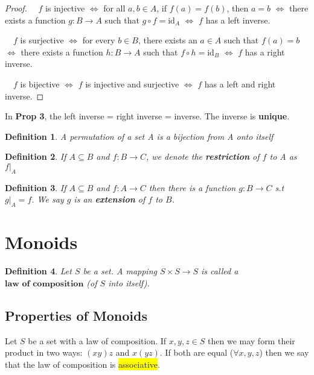 \documentclass[12pt]{article}
\let\to=\rightarrow
\newcommand{\mybox}[2][black]{\colorbox{#1}{#2}}
\newtheorem{definition}{Definition}
\begin{document}
\begin{proof}
\item[1] $\quad f$ is injective $\iff$ for all $a, b \in A$, if $f(a) = f(b)$, then $a = b$ $\iff$ there exists a function $g: B \to A$ such that $g \circ f = \text{id}_A$ $\iff$ $f$ has a left inverse.
\item[2] $\quad f$ is surjective $\iff$ for every $b \in B$, there exists an $a \in A$ such that $f(a) = b$ $\iff$ there exists a function $h: B \to A$ such that $f \circ h = \text{id}_B$ $\iff$ $f$ has a right inverse.
\item[3] $\quad f$ is bijective $\iff$ $f$ is injective and surjective $\iff$ $f$ has a left and right inverse.

\end{proof}

In \textbf{Prop 3}, the left inverse = right inverse = inverse. The inverse is \textbf{unique}.

\begin{definition}
A permutation of a set A is a bijection from A onto itself
\end{definition}

\begin{definition}
If $A \subseteq B$ and $f: B \to C$, we denote the \textbf{restriction} of $f$ to A as $f|_{A}$ 
\end{definition}

\begin{definition}
If $A \subseteq B$ and $f: A \to C$ then there is a function $g: B \to C$ s.t  $g|_{A} = f$. We say $g$ is an \textbf{extension} of $f$ to $B$. 
\end{definition}


\section{Monoids}
\begin{definition}
   
Let $S$ be a set. A mapping
 $S \times S \rightarrow S$ 
is called a $\textbf{law of composition}$ (of $S$ into itself).


\end{definition}

\subsection{Properties of Monoids}
Let $S$ be a set with a law of composition. If $x,y,z \in S$ then we may form their product in two ways: $(xy)z$ and $x(yz)$. If both are equal ($\forall x,y,z$) then we say that the law of composition is \mybox[yellow]{associative}.
\end{document}
